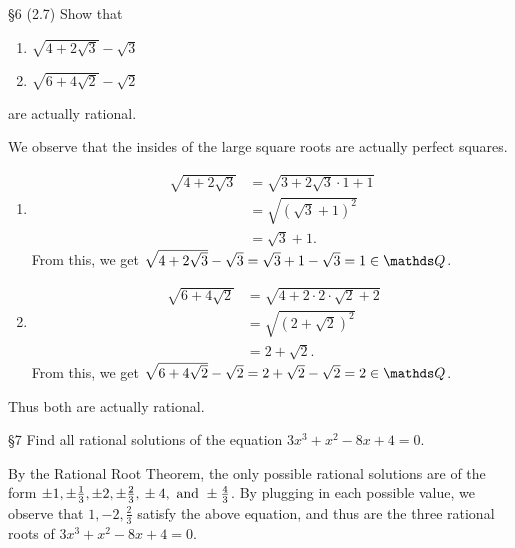 \documentclass{homework}
\begin{document}
\begin{problem}{\S 6}
  (2.7) Show that
  \begin{enumerate}[label=(\alph*)]
    \item $\sqrt{4+2\sqrt{3} } - \sqrt{3}$
    \item $\sqrt{6+4\sqrt{2} } -\sqrt{2} $
  \end{enumerate}
  are actually rational.
\end{problem}
\begin{solution}
  We observe that the insides of the large square roots are actually perfect squares.
  \begin{enumerate}[label=(\alph*)]
    \item 
      \begin{align*}
        \sqrt{4+2\sqrt{3}}  &= \sqrt{3+2\sqrt{3}\cdot 1+1}  \\
                            &= \sqrt{\left( \sqrt{3}+1  \right)^2 }  \\
                            &= \sqrt{3} +1
      .\end{align*}
      From this, we get $\sqrt{4+2\sqrt{3} } - \sqrt{3} =\sqrt{3} +1-\sqrt{3} =1\in \Q$.
    \item
      \begin{align*}
        \sqrt[]{6+4\sqrt{2} } &= \sqrt{4+2\cdot 2\cdot \sqrt{2} +2}  \\
                              &= \sqrt{\left( 2+\sqrt{2}  \right) ^2}  \\
                              &= 2+\sqrt{2} 
      .\end{align*}
      From this, we get $\sqrt{6+4\sqrt{2} } -\sqrt{2} =2+\sqrt{2} -\sqrt{2} =2\in \Q$.
  \end{enumerate}
  Thus both are actually rational.
\end{solution}

\begin{problem}{\S 7}
  Find all rational solutions of the equation $3x^3+x^2-8x+4=0$.
  
\end{problem}

\begin{solution}
  By the Rational Root Theorem, the only possible rational solutions are of the form $\pm 1,\pm
  \frac{1}{3},\pm 2,\pm \frac{2}{3},\\\pm 4,~\text{and}~\pm \frac{4}{3}$. By plugging in each possible
  value, we observe that  \textbf{$1,-2,\frac{2}{3}$}  satisfy the above equation, and thus are the
  three rational roots of $3x^3+x^2-8x+4=0$.
\end{solution}
\end{document}
